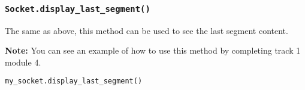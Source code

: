 \documentclass[11pt]{article}
\begin{document}
\subsubsection{\texttt{Socket.\textbf{display\_last\_segment()}}}
The same as above, this method can be used to see the last segment content.

\textbf{Note:}
You can see an example of how to use this method by completing track 1 module 4.

\begin{lstlisting}[caption={Example for using \texttt{display\_last\_segment()}}, language=Python]
my_socket.display_last_segment()
\end{lstlisting}
\end{document}
